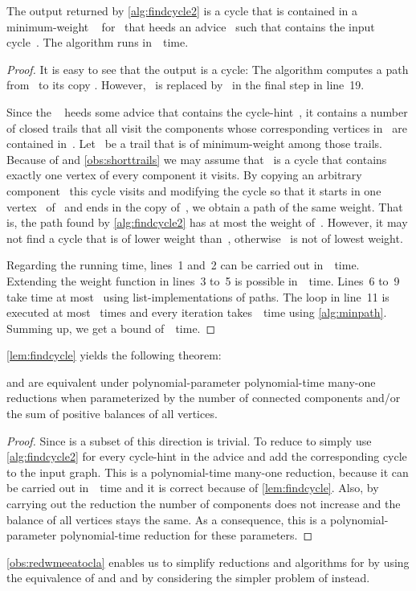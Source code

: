 \begin{lemma}\label{lem:findcycle}
  The output returned by \autoref{alg:findcycle2} is a cycle that is contained in a minimum-weight \EE{}~ for~ that heeds an advice~ such that  contains the input cycle~. The algorithm runs in~~time.
\end{lemma}
\begin{proof}
  It is easy to see that the output is a cycle: The algorithm computes a path from~ to its copy . However, ~is replaced by~ in the final step in line~19.

  Since the \EE{}~ heeds some advice that contains the cycle-hint~, it contains a number of closed trails that all visit the components whose corresponding vertices in~ are contained in~. Let~ be a trail that is of minimum-weight among those trails. Because of \SPP{} and \autoref{obs:shorttrails} we may assume that~ is a cycle that contains exactly one vertex of every component it visits. By copying an arbitrary component~ this cycle visits and modifying the cycle so that it starts in one vertex~ of~ and ends in the copy of~, we obtain a path of the same weight. That is, the path found by \autoref{alg:findcycle2} has at most the weight of~. However, it may not find a cycle that is of lower weight than~, otherwise~ is not of lowest weight.
  
  Regarding the running time, lines~1 and~2 can be carried out in~~time. Extending the weight function in lines~3 to~5 is possible in~~time. Lines~6 to~9 take time at most~ using list-implementations of paths. The loop in line~11 is executed at most ~times and every iteration takes~~time using \autoref{alg:minpath}. Summing up, we get a bound of~~time.
\end{proof}
\autoref{lem:findcycle} yields the following theorem:
\begin{theorem} 
  \label{obs:redwmeeatocla}
  \pWMEEA{} and \pWMEECLA{} are equivalent under polynomial-parameter polynomial-time many-one reductions when parameterized by the number of connected components and/or the sum of positive balances of all vertices.
\end{theorem}
\begin{proof}
  Since \pWMEECLAs{} is a subset of \pWMEEAs{} this direction is trivial. To reduce \pWMEEAs{} to \pWMEECLAs{} simply use \autoref{alg:findcycle2} for every cycle-hint in the advice and add the corresponding cycle to the input graph. This is a polynomial-time many-one reduction, because it can be carried out in~~time and it is correct because of \autoref{lem:findcycle}. Also, by carrying out the reduction the number of components does not increase and the balance of all vertices stays the same. As a consequence, this is a polynomial-parameter polynomial-time reduction for these parameters.
\end{proof}
\autoref{obs:redwmeeatocla} enables us to simplify reductions and algorithms for \pWMEEAs{} by using the equivalence of \pWMEEAs{} and \pWMEECLAs{} and by considering the simpler problem of \pWMEECLAs{} instead.

